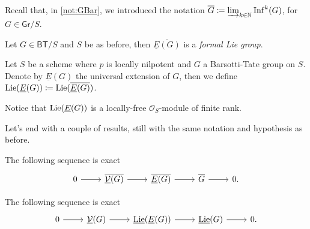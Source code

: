 \noindent
Recall that, in \cref{not:GBar}, we introduced the notation
$\overline{G} \coloneqq \varinjlim_{k \in \mathbb{N}} \mathrm{Inf}^k(G)$,
for $G \in \mathsf{Gr}/S$.


\begin{prop}\label{prop:ExtFLG}
	Let $G \in \mathsf{BT}/S$ and $S$ be as before,
	then $\overline{\underline{E}(G)}$ is a \emph{formal Lie group}.
\end{prop} 


\begin{defn}[]
	Let $S$ be a scheme where $p$ is locally nilpotent and $G$
	a Barsotti-Tate group on $S$.
	Denote by $\underline{E}(G)$ the universal extension of $G$, then we define
	$\operatorname{Lie}(\underline{E}(G)) \coloneqq \operatorname{Lie}(\overline{\underline{E}(G)})$.
\end{defn}


\begin{rem}[]
	Notice that $\operatorname{Lie}(\underline{E}(G))$ is a locally-free
	$\mathcal{O}_{ S }$-module of finite rank.
\end{rem}


\noindent
Let's end with a couple of results, still with the same notation and hypothesis as before.
\begin{prop}
	The following sequence is exact
	\begin{equation*}
	\begin{tikzcd}
		0 \arrow[r, "", rightarrow] &
		\overline{\underline{\mathcal{V}}(G)} \arrow[r, "", rightarrow] &
		\overline{\underline{E}(G)} \arrow[r, "", rightarrow] &
		\overline{G} \arrow[r, "", rightarrow] &
		0
	.\end{tikzcd}
	\end{equation*}
\end{prop} 


\begin{prop}\label{SESDieudonneCrystalEvaluation}
	The following sequence is exact
	\begin{equation*}
	\begin{tikzcd}
		0 \arrow[r, "", rightarrow] &
		\underline{\mathcal{V}}(G) \arrow[r, "", rightarrow] &
		\underline{\lie}(\underline{E}(G)) \arrow[r, "", rightarrow] &
		\underline{\lie}(G) \arrow[r, "", rightarrow] &
		0
	.\end{tikzcd}
	\end{equation*}
\end{prop} 



